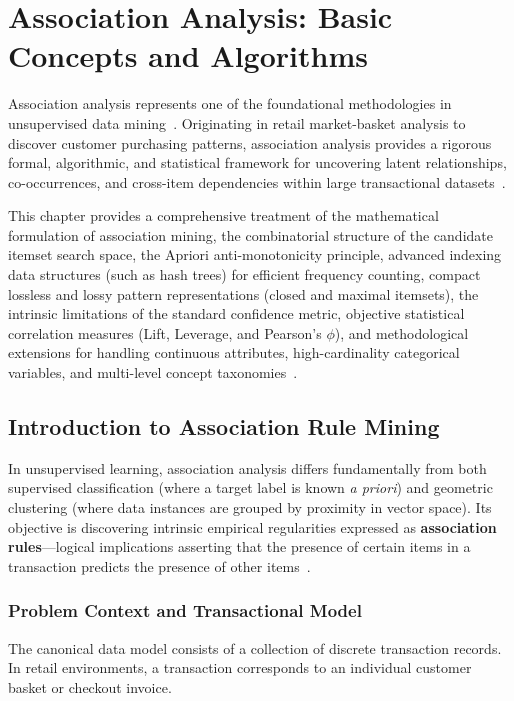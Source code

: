\chapter{Association Analysis: Basic Concepts and Algorithms}
\label{chap:dm-association-analysis}

Association analysis represents one of the foundational methodologies in unsupervised data mining~\cite{tan2018}. Originating in retail market-basket analysis to discover customer purchasing patterns, association analysis provides a rigorous formal, algorithmic, and statistical framework for uncovering latent relationships, co-occurrences, and cross-item dependencies within large transactional datasets~\cite{agrawal1993, agrawal1994}.

This chapter provides a comprehensive treatment of the mathematical formulation of association mining, the combinatorial structure of the candidate itemset search space, the Apriori anti-monotonicity principle, advanced indexing data structures (such as hash trees) for efficient frequency counting, compact lossless and lossy pattern representations (closed and maximal itemsets), the intrinsic limitations of the standard confidence metric, objective statistical correlation measures (Lift, Leverage, and Pearson's $\phi$), and methodological extensions for handling continuous attributes, high-cardinality categorical variables, and multi-level concept taxonomies~\cite{tan2018}.

\section{Introduction to Association Rule Mining}
\label{sec:dm-association-intro}

In unsupervised learning, association analysis differs fundamentally from both supervised classification (where a target label is known \textit{a priori}) and geometric clustering (where data instances are grouped by proximity in vector space). Its objective is discovering intrinsic empirical regularities expressed as \textbf{association rules}---logical implications asserting that the presence of certain items in a transaction predicts the presence of other items~\cite{tan2018, agrawal1993}.

\subsection{Problem Context and Transactional Model}
The canonical data model consists of a collection of discrete transaction records. In retail environments, a transaction corresponds to an individual customer basket or checkout invoice.

